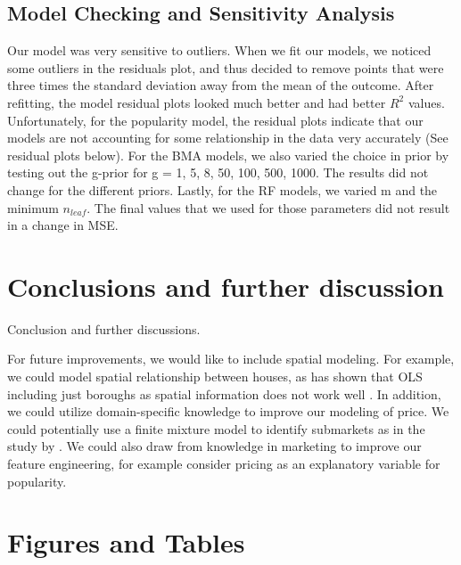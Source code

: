 \documentclass[10pt]{jmlr}%
\begin{document}
\subsection{Model Checking and Sensitivity Analysis}
Our model was very sensitive to outliers. When we fit our models, we noticed some outliers in the residuals plot, and thus decided to remove points that were three times the standard deviation away from the mean of the outcome. After refitting, the model residual plots looked much better and had better $R^2$ values. Unfortunately, for the popularity model, the residual plots indicate that our models are not accounting for some relationship in the data very accurately (See residual plots below). For the BMA models, we also varied the choice in prior by testing out the g-prior for g = 1, 5, 8, 50, 100, 500, 1000. The results did not change for the different priors. Lastly, for the RF models, we varied m and the minimum $n_{leaf}$. The final values that we used for those parameters did not result in a change in MSE. 

\section{Conclusions and further discussion}
\label{sec:conclusion}
Conclusion and further discussions.

For future improvements, we would like to include spatial modeling. For example, we could model spatial relationship between houses, as \cite{james2005apartment} has shown that OLS including just boroughs as spatial information does not work well . In addition, we could utilize domain-specific knowledge to improve our modeling of price. We could potentially use a finite mixture model to identify submarkets as in the study by \cite{belasco2012using}. We could also draw from knowledge in marketing to improve our feature engineering, for example consider pricing as an explanatory variable for popularity.





\newpage
\appendix

\section{Figures and Tables}
\label{appendix:fig}
\end{document}
